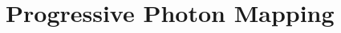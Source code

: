 \documentclass[main.tex]{subfiles}
\begin{document}
\section{Progressive Photon Mapping} \label{section:ppm_initial}
\end{document}
